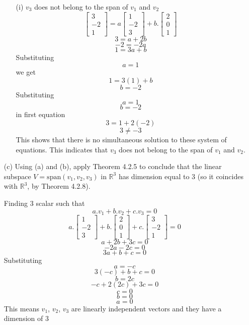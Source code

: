 \begin{enumerate}
\begin{enumerate}
      \item[(i)] $v_3$ does not belong to the span of $v_1$ and $v_2$ 
      \[
      \begin{bmatrix}
3 \\
-2 \\
1
\end{bmatrix} = a \begin{bmatrix}
1 \\
-2 \\
3
\end{bmatrix} + b .
\begin{bmatrix}
2 \\
0 \\
1
\end{bmatrix}
 \]
 \[
 3 = a + 2b
 \]
 \[
 -2 = -2a 
 \]
 \[
 1 = 3a + b
 \]
 Substituting
 \[
 a =1 
 \]
 we get 
 \[
 1 = 3(1) + b 
 \]
  \[
 b =-2
 \]
 Substituting
 \[
 a =1
 \]
 \[
 b=-2
 \]
 in first equation
 \[
 3 = 1 + 2(-2) 
 \]
 \[
 3 \neq -3
 \]
      This shows that there is no simultaneous solution to these system of equations.
This indicates that $v_3$ does not belong to the span of $v_1$ and $v_2$.
 \end{enumerate}

    
    
    \item[(c)] Using (a) and (b), apply Theorem 4.2.5 to conclude that the linear subspace $V = \text{span}(v_1, v_2, v_3)$ in $\mathbb{R}^3$ has dimension equal to 3 (so it coincides with $\mathbb{R}^3$, by Theorem 4.2.8).

    Finding 3 scalar such that \[
    a.v_1 + b.v_2 + c.v_3 = 0
    \]
    \[
    a . \begin{bmatrix}
1 \\
-2 \\
3
\end{bmatrix} + b .
\begin{bmatrix}
2 \\
0 \\
1
\end{bmatrix} + c .
\begin{bmatrix}
3 \\
-2 \\
1
\end{bmatrix} = 0
\]
\[
a + 2b + 3c = 0
\]
\[
-2a - 2c = 0
\]
\[
3a + b + c = 0
\]
Substituting
\[
a = -c
\]
\[
3(-c) +b + c = 0
\]
\[
b = 2c
\]
\[
-c + 2(2c) + 3c = 0
\]
\[
c = 0
\]
\[
b = 0
\]
\[
a = 0
\]
This means $v_1$,  $v_2$,  $v_3$ are linearly independent vectors and they have a dimension of 3
    
\end{enumerate}


